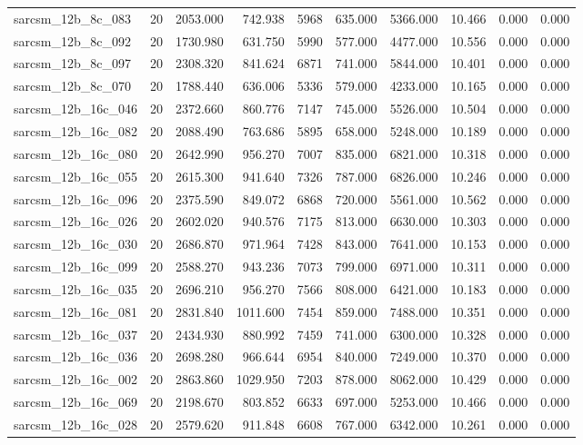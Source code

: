 \begin{tabular}{lrrrrrrrrr}
sarcsm\_12b\_8c\_083 & 20 & 2053.000 & 742.938 & 5968 & 635.000 & 5366.000 & 10.466 & 0.000 & 0.000 \\
sarcsm\_12b\_8c\_092 & 20 & 1730.980 & 631.750 & 5990 & 577.000 & 4477.000 & 10.556 & 0.000 & 0.000 \\
sarcsm\_12b\_8c\_097 & 20 & 2308.320 & 841.624 & 6871 & 741.000 & 5844.000 & 10.401 & 0.000 & 0.000 \\
sarcsm\_12b\_8c\_070 & 20 & 1788.440 & 636.006 & 5336 & 579.000 & 4233.000 & 10.165 & 0.000 & 0.000 \\
sarcsm\_12b\_16c\_046 & 20 & 2372.660 & 860.776 & 7147 & 745.000 & 5526.000 & 10.504 & 0.000 & 0.000 \\
sarcsm\_12b\_16c\_082 & 20 & 2088.490 & 763.686 & 5895 & 658.000 & 5248.000 & 10.189 & 0.000 & 0.000 \\
sarcsm\_12b\_16c\_080 & 20 & 2642.990 & 956.270 & 7007 & 835.000 & 6821.000 & 10.318 & 0.000 & 0.000 \\
sarcsm\_12b\_16c\_055 & 20 & 2615.300 & 941.640 & 7326 & 787.000 & 6826.000 & 10.246 & 0.000 & 0.000 \\
sarcsm\_12b\_16c\_096 & 20 & 2375.590 & 849.072 & 6868 & 720.000 & 5561.000 & 10.562 & 0.000 & 0.000 \\
sarcsm\_12b\_16c\_026 & 20 & 2602.020 & 940.576 & 7175 & 813.000 & 6630.000 & 10.303 & 0.000 & 0.000 \\
sarcsm\_12b\_16c\_030 & 20 & 2686.870 & 971.964 & 7428 & 843.000 & 7641.000 & 10.153 & 0.000 & 0.000 \\
sarcsm\_12b\_16c\_099 & 20 & 2588.270 & 943.236 & 7073 & 799.000 & 6971.000 & 10.311 & 0.000 & 0.000 \\
sarcsm\_12b\_16c\_035 & 20 & 2696.210 & 956.270 & 7566 & 808.000 & 6421.000 & 10.183 & 0.000 & 0.000 \\
sarcsm\_12b\_16c\_081 & 20 & 2831.840 & 1011.600 & 7454 & 859.000 & 7488.000 & 10.351 & 0.000 & 0.000 \\
sarcsm\_12b\_16c\_037 & 20 & 2434.930 & 880.992 & 7459 & 741.000 & 6300.000 & 10.328 & 0.000 & 0.000 \\
sarcsm\_12b\_16c\_036 & 20 & 2698.280 & 966.644 & 6954 & 840.000 & 7249.000 & 10.370 & 0.000 & 0.000 \\
sarcsm\_12b\_16c\_002 & 20 & 2863.860 & 1029.950 & 7203 & 878.000 & 8062.000 & 10.429 & 0.000 & 0.000 \\
sarcsm\_12b\_16c\_069 & 20 & 2198.670 & 803.852 & 6633 & 697.000 & 5253.000 & 10.466 & 0.000 & 0.000 \\
sarcsm\_12b\_16c\_028 & 20 & 2579.620 & 911.848 & 6608 & 767.000 & 6342.000 & 10.261 & 0.000 & 0.000 \\

\end{tabular}
